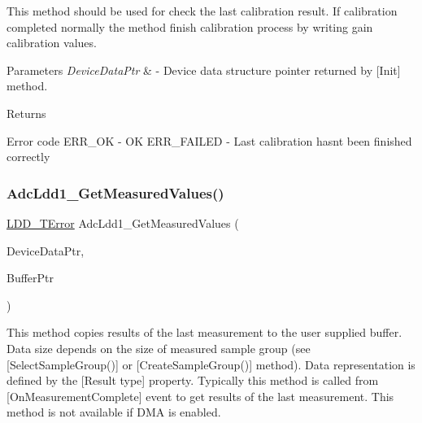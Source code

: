 This method should be used for check the last calibration result. If calibration completed normally the method finish calibration process by writing gain calibration values. 


\begin{DoxyParams}{Parameters}
{\em Device\+Data\+Ptr} & -\/ Device data structure pointer returned by \mbox{[}Init\mbox{]} method. \\
\hline
\end{DoxyParams}
\begin{DoxyReturn}{Returns}

\begin{DoxyItemize}
\item Error code E\+R\+R\+\_\+\+OK -\/ OK E\+R\+R\+\_\+\+F\+A\+I\+L\+ED -\/ Last calibration hasn\textquotesingle{}t been finished correctly 
\end{DoxyItemize}
\end{DoxyReturn}
\mbox{\label{group___adc_ldd1__module_ga30f524b93639b958a529d6f91c41ce6d}} 
\subsubsection{\texorpdfstring{Adc\+Ldd1\+\_\+\+Get\+Measured\+Values()}{AdcLdd1\_GetMeasuredValues()}}
{\footnotesize\ttfamily \hyperlink{group___p_e___types__module_ga24c2b045fd04e79e85f261ce4df35588}{L\+D\+D\+\_\+\+T\+Error} Adc\+Ldd1\+\_\+\+Get\+Measured\+Values (\begin{DoxyParamCaption}\item[{\hyperlink{group___p_e___types__module_gac5cf1362f1f0e3a2ce71b1bf2276d091}{L\+D\+D\+\_\+\+T\+Device\+Data} $\ast$}]{Device\+Data\+Ptr,  }\item[{\hyperlink{group___p_e___types__module_gade8ef9401405bd941b6da738b807f980}{L\+D\+D\+\_\+\+T\+Data} $\ast$}]{Buffer\+Ptr }\end{DoxyParamCaption})}



This method copies results of the last measurement to the user supplied buffer. Data size depends on the size of measured sample group (see \mbox{[}Select\+Sample\+Group()\mbox{]} or \mbox{[}Create\+Sample\+Group()\mbox{]} method). Data representation is defined by the \mbox{[}Result type\mbox{]} property. Typically this method is called from \mbox{[}On\+Measurement\+Complete\mbox{]} event to get results of the last measurement. This method is not available if D\+MA is enabled. 


